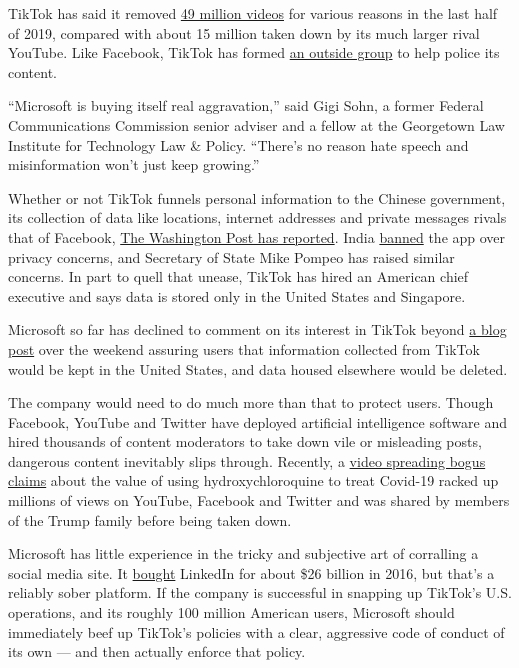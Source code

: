 TikTok has said it removed
\href{https://www.theverge.com/2020/7/9/21317832/tiktok-content-violations-videos-removed-49-million-2h2019-transparency-report}{49
million videos} for various reasons in the last half of 2019, compared
with about 15 million taken down by its much larger rival YouTube. Like
Facebook, TikTok has formed
\href{https://techcrunch.com/2020/03/18/tiktok-brings-in-outside-experts-to-help-it-craft-moderation-and-content-policies/}{an
outside group} to help police its content.

``Microsoft is buying itself real aggravation,'' said Gigi Sohn, a
former Federal Communications Commission senior adviser and a fellow at
the Georgetown Law Institute for Technology Law \& Policy. ``There's no
reason hate speech and misinformation won't just keep growing.''

Whether or not TikTok funnels personal information to the Chinese
government, its collection of data like locations, internet addresses
and private messages rivals that of Facebook,
\href{https://www.washingtonpost.com/technology/2020/07/13/tiktok-privacy/}{The
Washington Post has reported}. India
\href{https://www.nytimes3xbfgragh.onion/2020/06/30/technology/india-china-tiktok.html}{banned}
the app over privacy concerns, and Secretary of State Mike Pompeo has
raised similar concerns. In part to quell that unease, TikTok has hired
an American chief executive and says data is stored only in the United
States and Singapore.

Microsoft so far has declined to comment on its interest in TikTok
beyond
\href{https://blogs.microsoft.com/blog/2020/08/02/microsoft-to-continue-discussions-on-potential-tiktok-purchase-in-the-united-states/}{a
blog post} over the weekend assuring users that information collected
from TikTok would be kept in the United States, and data housed
elsewhere would be deleted.

The company would need to do much more than that to protect users.
Though Facebook, YouTube and Twitter have deployed artificial
intelligence software and hired thousands of content moderators to take
down vile or misleading posts, dangerous content inevitably slips
through. Recently, a
\href{https://www.nytimes3xbfgragh.onion/2020/07/28/technology/virus-video-trump.html}{video
spreading bogus claims} about the value of using hydroxychloroquine to
treat Covid-19 racked up millions of views on YouTube, Facebook and
Twitter and was shared by members of the Trump family before being taken
down.

Microsoft has little experience in the tricky and subjective art of
corralling a social media site. It
\href{https://www.nytimes3xbfgragh.onion/2016/12/08/technology/with-linkedin-microsoft-looks-to-avoid-past-acquisition-busts.html}{bought}
LinkedIn for about \$26 billion in 2016, but that's a reliably sober
platform. If the company is successful in snapping up TikTok's U.S.
operations, and its roughly 100 million American users, Microsoft should
immediately beef up TikTok's policies with a clear, aggressive code of
conduct of its own --- and then actually enforce that policy.

